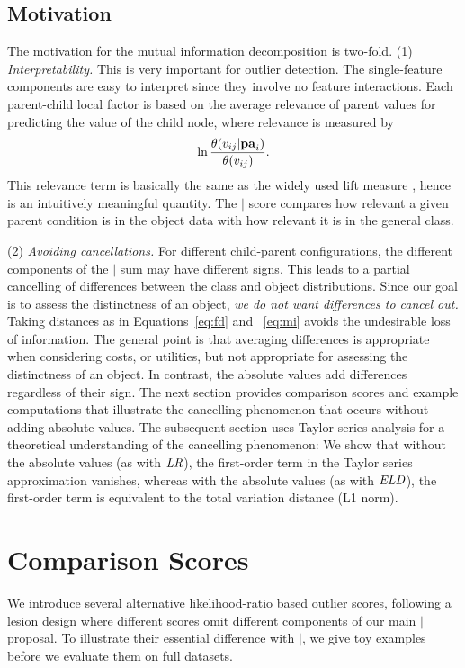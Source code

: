 {\subsection{Motivation} 

The motivation for the mutual information decomposition is two-fold. 
(1) {\em Interpretability.} This is very important for outlier detection. The single-feature components are easy to interpret since they involve no feature interactions. Each parent-child local factor is based on the average relevance of parent values for predicting the value of the child node, where relevance is measured by $$\ln \frac{\theta(v_{ij}|\mathbf{pa}_{i})}{\theta(v_{ij})}.$$ This relevance term  is basically the same as the widely used lift measure \cite{Tuffery2011}, hence is an intuitively meaningful quantity. The $\mid$ score compares how relevant a given parent condition is in the object data with how relevant it is in the general class. 


(2) {\em Avoiding cancellations.} 
For different child-parent configurations, the different components of the $\mid$ sum may have different signs. This leads to a partial cancelling of differences between the class and object distributions. Since our goal is to assess the distinctness of an object, {\em we do not want differences to cancel out.} Taking distances as in Equations~\eqref{eq:fd} and ~\eqref{eq:mi} avoids the undesirable loss of information. The general point is that averaging differences is appropriate when considering costs, or utilities, but not appropriate for assessing the distinctness of an object. In contrast, the absolute values add differences regardless of their sign. The next section provides comparison scores and example computations that illustrate the cancelling phenomenon that occurs without adding absolute values. The subsequent section uses Taylor series analysis for a theoretical understanding of the cancelling phenomenon: We show that without the absolute values (as with $\it{LR}$), the first-order term in the Taylor series approximation vanishes, whereas with the absolute values (as with $\it{ELD}$), the first-order term is equivalent to the total variation distance (L1 norm). 

\section{Comparison Scores} \label{sec:metrics}

We introduce several alternative likelihood-ratio based outlier scores, following a lesion design where different scores omit different components of our main $\mid$ proposal. %
To illustrate their essential difference with $\mid$, we give toy examples before we evaluate them on full datasets.

}

